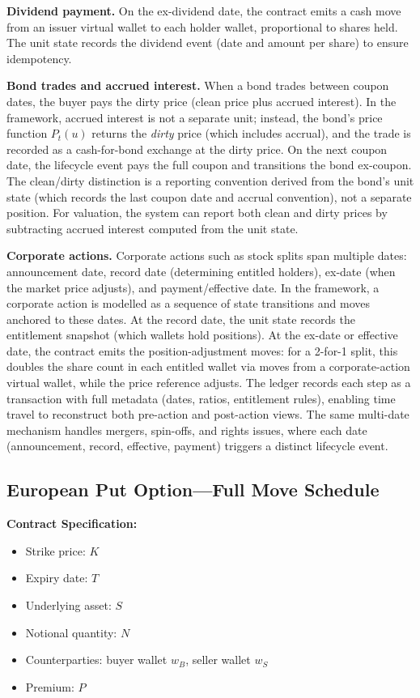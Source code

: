 \documentclass[11pt,a4paper]{article}
\begin{document}
\noindent\textbf{Dividend payment.} On the ex-dividend date, the contract emits a cash move from an issuer virtual wallet to each holder wallet, proportional to shares held. The unit state records the dividend event (date and amount per share) to ensure idempotency.

\noindent\textbf{Bond trades and accrued interest.} When a bond trades between coupon dates, the buyer pays the dirty price (clean price plus accrued interest). In the framework, accrued interest is not a separate unit; instead, the bond's price function $P_t(u)$ returns the \emph{dirty} price (which includes accrual), and the trade is recorded as a cash-for-bond exchange at the dirty price. On the next coupon date, the lifecycle event pays the full coupon and transitions the bond ex-coupon. The clean/dirty distinction is a reporting convention derived from the bond's unit state (which records the last coupon date and accrual convention), not a separate position. For valuation, the system can report both clean and dirty prices by subtracting accrued interest computed from the unit state.

\noindent\textbf{Corporate actions.} Corporate actions such as stock splits span multiple dates: announcement date, record date (determining entitled holders), ex-date (when the market price adjusts), and payment/effective date. In the framework, a corporate action is modelled as a sequence of state transitions and moves anchored to these dates. At the record date, the unit state records the entitlement snapshot (which wallets hold positions). At the ex-date or effective date, the contract emits the position-adjustment moves: for a 2-for-1 split, this doubles the share count in each entitled wallet via moves from a corporate-action virtual wallet, while the price reference adjusts. The ledger records each step as a transaction with full metadata (dates, ratios, entitlement rules), enabling time travel to reconstruct both pre-action and post-action views. The same multi-date mechanism handles mergers, spin-offs, and rights issues, where each date (announcement, record, effective, payment) triggers a distinct lifecycle event.

\subsection{European Put Option---Full Move Schedule}

\noindent\textbf{Contract Specification:}
\begin{itemize}[nosep]
\item Strike price: $K$
\item Expiry date: $T$
\item Underlying asset: $S$
\item Notional quantity: $N$
\item Counterparties: buyer wallet $w_B$, seller wallet $w_S$
\item Premium: $P$
\end{itemize}
\end{document}
